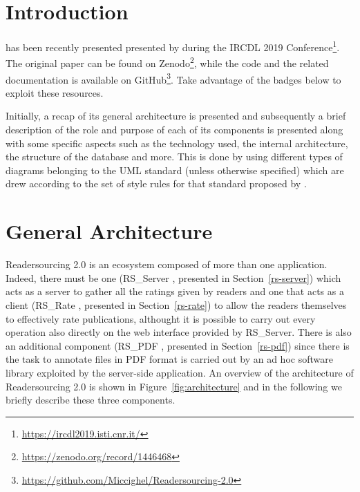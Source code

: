 \documentclass[a4paper, english]{article}
\begin{document}
\maketitle

\tableofcontents

\newpage

\listoffigures

\newpage

\listoftables

\newpage


\section{Introduction}


has been recently presented presented by \citet{Soprano2019} during the IRCDL 2019 Conference\footnote{\url{https://ircdl2019.isti.cnr.it/}}. The original paper can be found on Zenodo\footnote{\url{https://zenodo.org/record/1446468}}, while the code and the related documentation is available on GitHub\footnote{\url{https://github.com/Miccighel/Readersourcing-2.0}}. Take advantage of the badges below to exploit these resources.

Initially, a recap of its general architecture is presented and subsequently a brief description of the role and purpose of each of its components is presented along with some specific aspects such as the technology used, the internal architecture, the structure of the database and more. This is done by using different types of diagrams belonging to the UML standard (unless otherwise specified) which are drew according to the set of style rules for that standard proposed by \citet{Fowler03}.

\section{General Architecture}

Readersourcing 2.0 is an ecosystem composed of more than one application. Indeed, there must be one (RS\_Server \cite{RS-Server}, presented in Section~\ref{rs-server}) which acts as a server to gather all the ratings given by readers and one that acts as a client (RS\_Rate \cite{RS-Rate}, presented in Section~\ref{rs-rate}) to allow the readers themselves to effectively rate publications, althought it is possible to carry out every operation also directly on the web interface provided by RS\_Server. There is also an additional component (RS\_PDF \cite{RS-PDF}, presented in Section~\ref{rs-pdf}) since there is the task to annotate files in PDF format is carried out by an ad hoc software library exploited by the server-side application. An overview of the architecture of Readersourcing 2.0 is shown in Figure~\ref{fig:architecture} and in the following we briefly describe these three components. 
\end{document}
